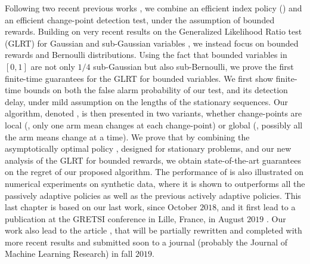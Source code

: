 
Following two recent previous works \cite{LiuLeeShroff17,CaoZhenKvetonXie18}, we combine an efficient index policy (\klUCB) and an efficient change-point detection test, under the assumption of bounded rewards.
Building on very recent results on the Generalized Likelihood Ratio test (GLRT) for Gaussian and sub-Gaussian variables \cite{Maillard2018GLR}, we instead focus on bounded rewards and Bernoulli distributions.
Using the fact that bounded variables in $[0,1]$ are not only $1/4$ sub-Gaussian but also sub-Bernoulli, we prove the first finite-time guarantees for the GLRT for bounded variables.
We first show finite-time bounds on both the false alarm probability of our test, and its detection delay, under mild assumption on the lengths of the stationary sequences.
Our algorithm, denoted \GLRklUCB, is then presented in two variants, whether change-points are local (\ie, only one arm mean changes at each change-point) or global (\ie, possibly all the arm means change at a time).
%
We prove that by combining the asymptotically optimal policy \klUCB, designed for stationary problems, and our new analysis of the GLRT for bounded rewards, we obtain state-of-the-art guarantees on the regret of our proposed algorithm.
%
The performance of \GLRklUCB{} is also illustrated on numerical experiments on synthetic data, where it is shown to outperforms all the passively adaptive policies as well as the previous actively adaptive policies.
%
This last chapter is based on our last work, since October $2018$, and it first lead to a publication at the GRETSI conference in Lille, France, in August $2019$ \cite{Besson2019Gretsi}.
Our work also lead to the article \cite{Besson2019GLRT}, that will be partially rewritten and completed with more recent results and submitted soon to a journal (probably the Journal of Machine Learning Research) in fall $2019$.




